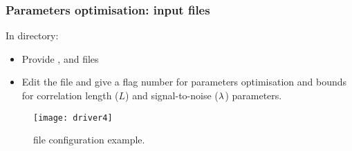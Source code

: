 
\begin{frame}
\frametitle{Parameters optimisation: input files}

\centerline{In  directory:}
\small{
\begin{itemize}
\item Provide ,  and  files
\item Edit the  file and give a flag number for parameters optimisation and bounds for correlation length ($L$) and signal-to-noise ($\lambda$) parameters.
\end{itemize}
}
\vspace{-0.3cm}

\begin{figure}
\centering
\texttt{[image: driver4]}
\caption{ file configuration example.}
\end{figure}

\end{frame}

